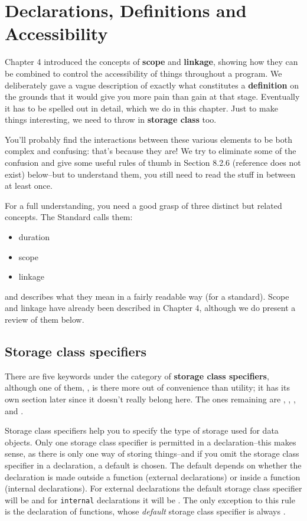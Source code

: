  
        \section{Declarations, Definitions and Accessibility}
        

  

  Chapter 4 introduced the concepts of \textbf{scope} and
   \textbf{linkage}, showing how they can be combined to control the
   accessibility of things throughout a program. We deliberately gave
   a vague description of exactly what constitutes a \textbf{definition}
   on the grounds that it would give you more pain than gain at that stage.
   Eventually it has to be spelled out in detail, which we do in this
   chapter. Just to make things interesting, we need to throw in
   \textbf{storage class} too.


  You'll probably find the interactions between these various elements to
   be both complex and confusing: that's because they are! We try to
   eliminate some of the confusion and give some useful rules of thumb in
   Section 8.2.6 (reference does not exist) below--but to understand them, you still
   need to read the stuff in between at least once.


  For a full understanding, you need a good grasp of three distinct but
   related concepts. The Standard calls them:


  \begin{itemize}
   \item duration
   \item scope
   \item linkage
  \end{itemize}

  and describes what they mean in a fairly readable way (for a standard).
   Scope and linkage have already been described in Chapter 4,
   although we do present a review of them below.


  \subsection{Storage class specifiers}
   

   There are five keywords under the category of \textbf{storage class
    specifiers}, although one of them, \typedef, is there
    more out of convenience than utility; it has its own section later since
    it doesn't really belong here. The ones remaining are \auto,
    \extern, \register, and \static.


   Storage class specifiers help you to specify the type of storage used
    for data objects. Only one storage class specifier is permitted in
    a declaration--this makes sense, as there is only one way of storing
    things--and if you omit the storage class specifier in
    a declaration, a default is chosen. The default depends on whether the
    declaration is made outside a function (external declarations) or inside
    a function (internal declarations). For external declarations the
    default storage class specifier will be \extern{} and for
    \texttt{internal} declarations it will be \auto. The
    only exception to this rule is the declaration of functions, whose
    \textit{default} storage class specifier is always
    \extern.


